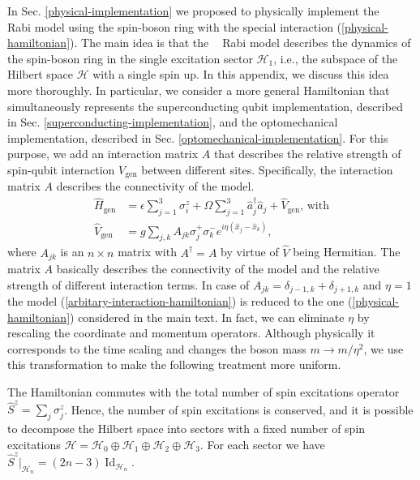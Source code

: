 \documentclass[reprint, aps, prx, amsmath, amssymb, longbibliography, superscriptaddress]{revtex4-2}
\DeclareMathOperator{\Zthree}{\mathbb{Z}_3}
\begin{document}
In Sec. \ref{physical-implementation} we proposed to physically implement the $\Zthree$ Rabi model using the spin-boson ring with the special interaction (\ref{physical-hamiltonian}). The main idea is that the $\Zthree$ Rabi model describes the dynamics of the spin-boson ring in the single excitation sector $\mathcal{H}_1$, i.e., the subspace of the Hilbert space $\mathcal{H}$ with a single spin up. In this appendix, we discuss this idea more thoroughly. In particular, we consider a more general Hamiltonian that simultaneously represents the superconducting qubit implementation, described in Sec. \ref{superconducting-implementation}, and the optomechanical implementation, described in Sec.  \ref{optomechanical-implementation}.
For this purpose, we add an interaction matrix $A$ that describes the relative strength of spin-qubit interaction $V_{\text{gen}}$ between different sites. Specifically, the interaction matrix $A$ describes the connectivity of the model.
\begin{equation}
\label{arbitary-interaction-hamiltonian}
\begin{aligned}
    \hat H_{\text{gen}} &= \epsilon \sum\limits_{j=1}^3 \sigma_i^z + \Omega \sum\limits_{j=1}^3 \hat a_j^{\dagger} \hat a_j + \hat V_{\text{gen}}, \, \text{with} \\
    \hat V_{\text{gen}} &= g \sum\limits_{j,k} A_{jk} \sigma_j^+ \sigma_k^- e^{i\eta (\hat x_j - \hat x_k)},
\end{aligned}
\end{equation}
where $A_{jk}$ is an $n\times n$ matrix with $ A^{\dagger} = A $ by virtue of $\hat V$ being Hermitian. The matrix $A$ basically describes the connectivity of the model and the relative strength of different interaction terms. In case of $A_{jk} = \delta_{j-1,k} + \delta_{j+1,k} $ and $\eta = 1 $ the model (\ref{arbitary-interaction-hamiltonian}) is reduced to the one (\ref{physical-hamiltonian}) considered in the main text. In fact, we can eliminate $\eta$ by rescaling the coordinate and momentum operators. Although physically it corresponds to the time scaling and changes the boson mass $m \to m/\eta^2$, we use this transformation to make the following treatment more uniform.

The Hamiltonian commutes with the total number of spin excitations operator $\hat S^z = \sum_j \sigma_j^z $. Hence, the number of spin excitations is conserved, and it is possible to decompose the Hilbert space into sectors with a fixed number of spin excitations $\mathcal{H} = \mathcal{H}_0 \oplus \mathcal{H}_1 \oplus \mathcal{H}_2 \oplus \mathcal{H}_3$. For each sector we have $\hat S^z |_{\mathcal{H}_n} = (2n - 3) \operatorname{Id}_{\mathcal{H}_n}$.
\end{document}
